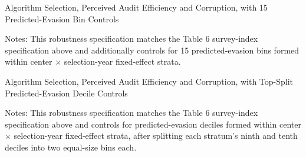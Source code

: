\documentclass{article}
\newcommand{\OutPath}{Output/}%
\newcommand{\OutPath}{../Output/}%
\begin{document}
\begin{table}[H]\centering
\begin{adjustbox}{max width=\textwidth}
\begin{threeparttable}
\caption{Algorithm Selection, Perceived Audit Efficiency and Corruption, with 15 Predicted-Evasion Bin Controls}
\label{tab:table6_indices_yhatrf_15bins_control}

\footnotesize


\begin{tablenotes}[flushleft]
\footnotesize
\item Notes: This robustness specification matches the Table 6 survey-index specification above and additionally controls for 15 predicted-evasion bins formed within center $\times$ selection-year fixed-effect strata.
\end{tablenotes}
\end{threeparttable}
\end{adjustbox}
\end{table}

\begin{table}[H]\centering
\begin{adjustbox}{max width=\textwidth}
\begin{threeparttable}
\caption{Algorithm Selection, Perceived Audit Efficiency and Corruption, with Top-Split Predicted-Evasion Decile Controls}
\label{tab:table6_indices_yhatrf_topsplit_control}

\footnotesize


\begin{tablenotes}[flushleft]
\footnotesize
\item Notes: This robustness specification matches the Table 6 survey-index specification above and controls for predicted-evasion deciles formed within center $\times$ selection-year fixed-effect strata, after splitting each stratum's ninth and tenth deciles into two equal-size bins each.
\end{tablenotes}
\end{threeparttable}
\end{adjustbox}
\end{table}
\end{document}
